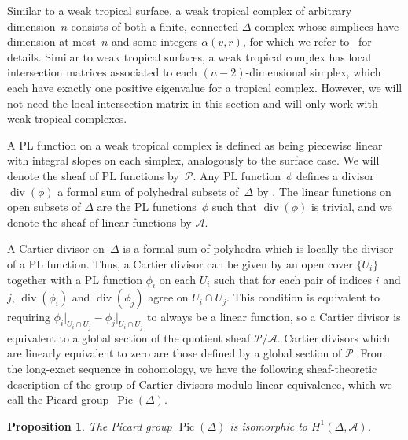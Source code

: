 \documentclass[11pt]{amsart}
\newtheorem{prop}[thm]{Proposition}
\theoremstyle{definition}
\newcommand{\cA}{\mathcal A}
\newcommand{\cP}{\mathcal P}
\newcommand{\Pic}{\operatorname{Pic}}
\renewcommand{\div}{\operatorname{div}}
\begin{document}
Similar to a weak tropical surface, a weak tropical complex of arbitrary
dimension~$n$ consists of both a finite, connected $\Delta$-complex whose
simplices have dimension at most~$n$ and some integers $\alpha(v,r)$, for which
we refer to~\cite[Def.~2.1]{cartwright-complexes} for
details. Similar to weak tropical surfaces, a weak tropical complex has local
intersection matrices associated to each $(n-2)$-dimensional simplex, which each
have exactly one positive eigenvalue for a tropical complex. However, we will
not need the local intersection matrix in this section and will only work with
weak tropical complexes.

A PL function on a weak tropical complex is defined as being piecewise linear
with integral slopes on each simplex, analogously to the surface
case. We will
denote the sheaf of PL functions by~$\cP$. Any PL function~$\phi$ defines a
divisor $\div(\phi)$ a formal sum of polyhedral subsets of~$\Delta$ by
\cite[Prop.~4.5]{cartwright-complexes}. The linear functions on open subsets of
$\Delta$ are the PL functions~$\phi$ such that $\div(\phi)$ is trivial, and we
denote the sheaf of linear functions by $\cA$.

A Cartier divisor on~$\Delta$ is a formal sum of polyhedra which is locally the
divisor of a PL function. Thus, a Cartier divisor can be given by an open cover
$\{U_i\}$ together with a PL function $\phi_i$ on each $U_i$ such that for each
pair of indices $i$ and $j$, $\div(\phi_i)$ and $\div(\phi_j)$ agree on $U_i
\cap U_j$. This condition is equivalent to requiring $\phi_i\vert_{U_i \cap U_j}
- \phi_j \vert_{U_i \cap U_j}$ to always be a linear function, so a Cartier
divisor is equivalent to a global section of the quotient sheaf $\cP / \cA$.
Cartier divisors which are linearly equivalent to zero are those defined by a
global section of $\cP$. From the long-exact sequence in cohomology, we have the
following sheaf-theoretic description of the group of Cartier divisors modulo
linear equivalence, which we call the Picard group~$\Pic(\Delta)$.

\begin{prop}\label{prop:h-1}
The Picard group $\Pic(\Delta)$ is isomorphic to
$H^1(\Delta, \cA)$.
\end{prop}
\end{document}
